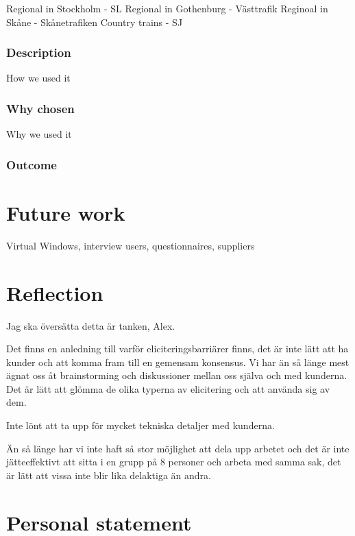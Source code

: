 \documentclass[a4paper]{article}
\begin{document}
    Regional in Stockholm - SL
    Regional in Gothenburg - Västtrafik
    Reginoal in Skåne - Skånetrafiken
    Country trains - SJ
    
    \subsubsection{Description}
    How we used it
    \subsubsection{Why chosen}
    Why we used it
    \subsubsection{Outcome}
    
  \section{Future work}
  Virtual Windows, interview users, questionnaires, suppliers
  
  \section{Reflection}

  Jag ska översätta detta är tanken, Alex.

  Det finns en anledning till varför eliciteringsbarriärer finns, det är inte lätt att ha kunder och att komma fram till en gemensam konsensus.
  Vi har än så länge mest ägnat oss åt brainstorming och diskussioner mellan oss själva och med kunderna. Det är lätt att glömma de olika typerna av elicitering och att använda sig av dem. 
  
  Inte lönt att ta upp för mycket tekniska detaljer med kunderna.

	Än så länge har vi inte haft så stor möjlighet att dela upp arbetet och det är inte jätteeffektivt att sitta i en grupp på 8 personer och arbeta med samma sak, det är lätt att vissa inte blir lika delaktiga än andra. 


  \section{Personal statement}
  
\end{document}
